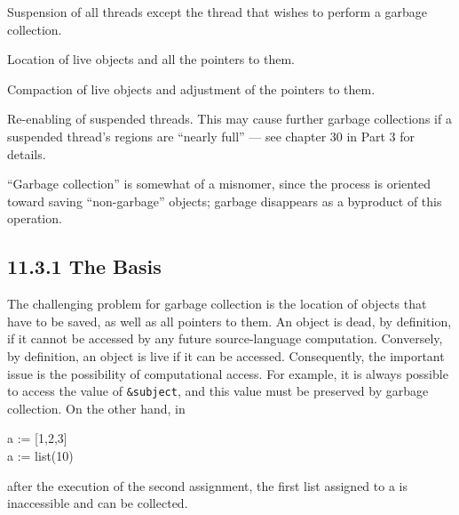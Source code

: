 \liststyleLxii
\begin{itemize}
{\color{blue}
\item
  Suspension of all threads except the thread that wishes to perform a
  garbage collection.
}
\item 
  Location of live objects and all the pointers to them.
\item 
  Compaction of live objects and adjustment of the pointers to them.
{\color{blue}
\item
  Re-enabling of suspended threads. This may cause further garbage
  collections if a suspended thread's regions are ``nearly full'' ---
  see chapter 30 in Part 3 for details.
}
\end{itemize}

``Garbage collection'' is somewhat of a misnomer, since the process is
oriented toward saving ``non-garbage'' objects; garbage disappears as
a byproduct of this operation.

\subsection[11.3.1 The Basis]{11.3.1 The Basis}

The challenging problem for garbage collection is the location of
objects that have to be saved, as well as all pointers to them. An
object is dead, by definition, if it cannot be accessed by any future
source-language computation.  Conversely, by definition, an object is
live if it can be accessed. Consequently, the important issue is the
possibility of computational access. For example, it is always
possible to access the value of \texttt{\&subject}, and this value
must be preserved by garbage collection. On the other hand, in

\begin{iconcode}
\>a := [1,2,3]\\
\>a := list(10)
\end{iconcode}

\noindent after the execution of the second assignment, the first list
assigned to a is inaccessible and can be collected.

